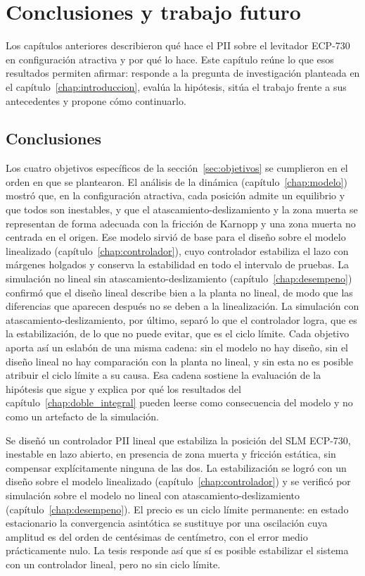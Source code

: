 \chapter{Conclusiones y trabajo futuro}\label{chap:conclusiones}

Los capítulos anteriores describieron qué hace el PII sobre el levitador ECP-730 en configuración atractiva y por qué lo hace. Este capítulo reúne lo que esos resultados permiten afirmar: responde a la pregunta de investigación planteada en el capítulo~\ref{chap:introduccion}, evalúa la hipótesis, sitúa el trabajo frente a sus antecedentes y propone cómo continuarlo.

\section{Conclusiones}\label{sec:conclusiones}

Los cuatro objetivos específicos de la sección~\ref{sec:objetivos} se cumplieron en el orden en que se plantearon. El análisis de la dinámica (capítulo~\ref{chap:modelo}) mostró que, en la configuración atractiva, cada posición admite un equilibrio y que todos son inestables, y que el atascamiento-deslizamiento y la zona muerta se representan de forma adecuada con la fricción de Karnopp y una zona muerta no centrada en el origen. Ese modelo sirvió de base para el diseño sobre el modelo linealizado (capítulo~\ref{chap:controlador}), cuyo controlador estabiliza el lazo con márgenes holgados y conserva la estabilidad en todo el intervalo de pruebas. La simulación no lineal sin atascamiento-deslizamiento (capítulo~\ref{chap:desempeno}) confirmó que el diseño lineal describe bien a la planta no lineal, de modo que las diferencias que aparecen después no se deben a la linealización. La simulación con atascamiento-deslizamiento, por último, separó lo que el controlador logra, que es la estabilización, de lo que no puede evitar, que es el ciclo límite. Cada objetivo aporta así un eslabón de una misma cadena: sin el modelo no hay diseño, sin el diseño lineal no hay comparación con la planta no lineal, y sin esta no es posible atribuir el ciclo límite a su causa. Esa cadena sostiene la evaluación de la hipótesis que sigue y explica por qué los resultados del capítulo~\ref{chap:doble_integral} pueden leerse como consecuencia del modelo y no como un artefacto de la simulación.

Se diseñó un controlador PII lineal que estabiliza la posición del SLM ECP-730, inestable en lazo abierto, en presencia de zona muerta y fricción estática, sin compensar explícitamente ninguna de las dos. La estabilización se logró con un diseño sobre el modelo linealizado (capítulo~\ref{chap:controlador}) y se verificó por simulación sobre el modelo no lineal con atascamiento-deslizamiento (capítulo~\ref{chap:desempeno}). El precio es un ciclo límite permanente: en estado estacionario la convergencia asintótica se sustituye por una oscilación cuya amplitud es del orden de centésimas de centímetro, con el error medio prácticamente nulo. La tesis responde así que sí es posible estabilizar el sistema con un controlador lineal, pero no sin ciclo límite.

